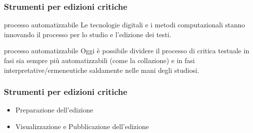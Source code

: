 %
%
%
%
%
%
%
%
%




\begin{frame}
	\frametitle{Strumenti per edizioni critiche}
	\addtocounter{nframe}{1}
    \begin{block}{processo automatizzabile}
       Le tecnologie digitali e i metodi computazionali stanno innovando il processo per lo studio e l'edizione dei testi.
    \end{block}
    \begin{block}{processo automatizzabile}
        Oggi è possibile dividere il processo di critica testuale in fasi sia sempre più automatizzabili (come la collazione) e in fasi interpretative/ermeneutiche saldamente nelle mani degli studiosi.
     \end{block}
	
\end{frame}

\begin{frame}
	\frametitle{Strumenti per edizioni critiche}
	\addtocounter{nframe}{1}
   
    \begin{center}
        \begin{itemize}
            \item Preparazione dell'edizione
            \item Visualizzazione e Pubblicazione dell'edizione
        \end{itemize}
    \end{center}
	
\end{frame}

